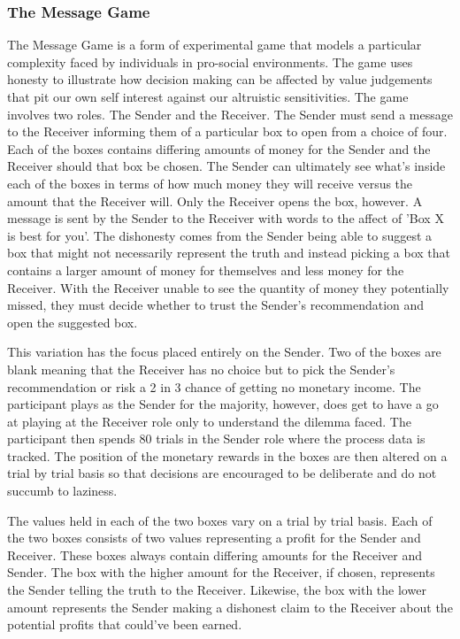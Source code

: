 \documentclass[man, floatsintext]{apa7}
\begin{document}
\subsubsection{The Message Game}
The Message Game is a form of experimental game that models a particular complexity faced by individuals in pro-social environments. The game uses honesty to illustrate how decision making can be affected by value judgements that pit our own self interest against our altruistic sensitivities. 
The game involves two roles. The Sender and the Receiver. The Sender must send a message to the Receiver informing them of a particular box to open from a choice of four. Each of the boxes contains differing amounts of money for the Sender and the Receiver should that box be chosen. The Sender can ultimately see what's inside each of the boxes in terms of how much money they will receive versus the amount that the Receiver will. Only the Receiver opens the box, however. A message is sent by the Sender to the Receiver with words to the affect of 'Box X is best for you'. The dishonesty comes from the Sender being able to suggest a box that might not necessarily represent the truth and instead picking a box that contains a larger amount of money for themselves and less money for the Receiver. With the Receiver unable to see the quantity of money they potentially missed, they must decide whether to trust the Sender's recommendation and open the suggested box.

This variation has the focus placed entirely on the Sender. Two of the boxes are blank meaning that the Receiver has no choice but to pick the Sender's recommendation or risk a 2 in 3 chance of getting no monetary income. The participant plays as the Sender for the majority, however, does get to have a go at playing at the Receiver role only to understand the dilemma faced. The participant then spends 80 trials in the Sender role where the process data is tracked. The position of the monetary rewards in the boxes are then altered on a trial by trial basis so that decisions are encouraged to be deliberate and do not succumb to laziness. 

The values held in each of the two boxes vary on a trial by trial basis. Each of the two boxes consists of two values representing a profit for the Sender and Receiver. These boxes always contain differing amounts for the Receiver and Sender. The box with the higher amount for the Receiver, if chosen, represents the Sender telling the truth to the Receiver. Likewise, the box with the lower amount represents the Sender making a dishonest claim to the Receiver about the potential profits that could've been earned.
\end{document}
